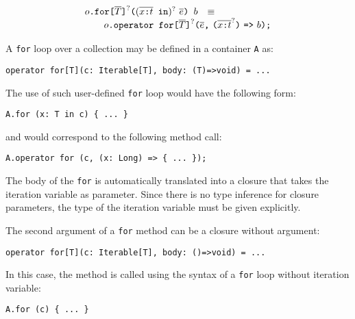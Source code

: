 
$$
\begin{array}{rcl}
  \usrFor{o}{\overline{T}}{\overline{\vardecl{x}{t}}}{\overline{e}}{b}
  & \equiv &
  \\
  \multicolumn{3}{r}{
  \qquad  \libFor{o}{\overline{T}}{\overline{\vardecl{x}{t}}}{\overline{e}}{b}
  }
\end{array}
$$

A \verb+for+ loop over a collection may be defined in a container \verb+A+ as:
\begin{verbatim}
operator for[T](c: Iterable[T], body: (T)=>void) = ...
\end{verbatim}
%
The use of such user-defined \verb+for+ loop would have the following form:
\begin{verbatim}
A.for (x: T in c) { ... }
\end{verbatim}
and would correspond to the following method call:
\begin{verbatim}
A.operator for (c, (x: Long) => { ... });
\end{verbatim}
%
The body of the \verb+for+ is automatically translated into a closure
that takes the iteration variable as parameter.
%
Since there is no type inference for closure parameters, the type of
the iteration variable must be given explicitly.

The second argument of a \verb+for+ method can be a closure without argument:
\begin{verbatim}
operator for[T](c: Iterable[T], body: ()=>void) = ...
\end{verbatim}
In this case, the method is called using the syntax of a \verb+for+ loop without iteration variable:
\begin{verbatim}
A.for (c) { ... }
\end{verbatim}

